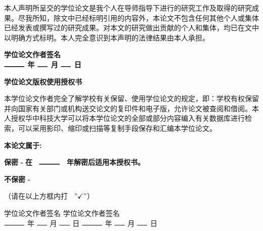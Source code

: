 \begin{CJK*}{UTF8}{gbsn}
 
本人声明所呈交的学位论文是我个人在导师指导下进行的研究工作及取得的研究成果。尽我所知，除文中已经标明引用的内容外，本论文不包含任何其他个人或集体已经发表或撰写过的研究成果。对本文的研究做出贡献的个人和集体，均已在文中以明确方式标明。本人完全意识到本声明的法律结果由本人承担。

\vspace{2cm}

\begin{flushright}
\bfseries
    学位论文作者签名 \\
    $\rule{1cm}{0.3mm}$ 年 $\rule{0.5cm}{0.3mm}$ 月 $\rule{0.5cm}{0.3mm}$ 日
\end{flushright}
    
\vspace{1cm}

\begin{center}
    \Large \bfseries
    学位论文版权使用授权书
\end{center}

\vspace{1cm}

本学位论文作者完全了解学校有关保留、使用学位论文的规定，即：学校有权保留并向国家有关部门或机构送交论文的复印件和电子版，允许论文被查阅和借阅。本人授权华中科技大学可以将本学位论文的全部或部分内容编入有关数据库进行检索，可以采用影印、缩印或扫描等复制手段保存和汇编本学位论文。

\vspace{0.5cm}

\textbf{本论文属于:}

\setlength{\parskip}{0pt}

\hspace{0.7cm} \textbf{保密} \hspace{0.5cm} $\bm{\square}$ \hfill{\textbf{在 \ $\rule{1cm}{0.3mm}$ \ 年解密后适用本授权书。}}

\hspace{0.7cm} \textbf{不保密} \hspace{0.07cm} $\bm{\square}$

（请在以上方框内打 \ $"\checkmark"$）

\vspace{2cm}

\begin{flushleft}
\bfseries

    学位论文作者签名 \hfill{学位论文作者签名} \\
    $\rule{1cm}{0.3mm}$ 年 $\rule{0.5cm}{0.3mm}$ 月 $\rule{0.5cm}{0.3mm}$ 日 \hfill{$\rule{1cm}{0.3mm}$ 年 $\rule{0.5cm}{0.3mm}$ 月 $\rule{0.5cm}{0.3mm}$ 日}

\end{flushleft}

\end{CJK*}